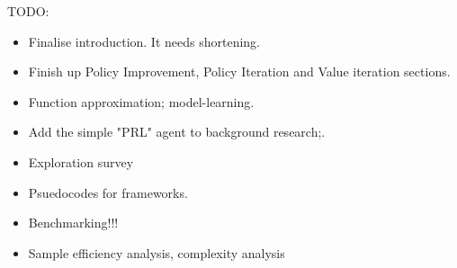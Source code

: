 TODO:
\begin{itemize}
    \item Finalise introduction. It needs shortening.
    \item Finish up Policy Improvement, Policy Iteration and Value iteration sections.
    \item Function approximation; model-learning.
    \item Add the simple "PRL" agent to background research;.
    \item Exploration survey
    \item Psuedocodes for frameworks.
    \item Benchmarking!!!
    \item Sample efficiency analysis, complexity analysis
\end{itemize}